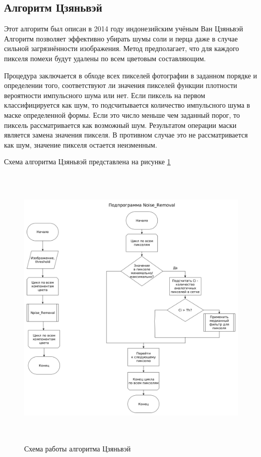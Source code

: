 \subsection{Алгоритм Цзяньвэй}
Этот алгоритм был описан в 2014 году индонезийским учёным Ван Цзяньвэй \cite{color_image}
Алгоритм позволяет эффективно убирать шумы соли и перца даже в случае сильной загрязнённости изображения.
Метод предполагает, что для каждого пикселя помехи будут удалены по всем цветовым составляющим.

Процедура заключается в обходе всех пикселей фотографии в заданном порядке и определении того, соответствуют ли значения пикселей функции плотности вероятности импульсного шума или нет. 
Если пиксель на первом классифицируется как шум, то подсчитывается количество импульсного шума в маске определенной формы. 
Если это число меньше чем заданный порог, то пиксель рассматривается как возможный шум. 
Результатом операции маски является замена значения пикселя.
В противном случае это не рассматривается как шум, значение пикселя остается неизменным.

Схема алгоритма Цзяньвэй представлена на рисунке \ref{fig::china}
\FloatBarrier
\begin{figure}[h]	
	\begin{center}
		\includegraphics[height=14cm]{inc/png/china.png}
	\end{center}
	\captionsetup{justification=centering}
	\caption{Схема работы алгоритма Цзяньвэй}
	\label{fig::china}
\end{figure}
\FloatBarrier

